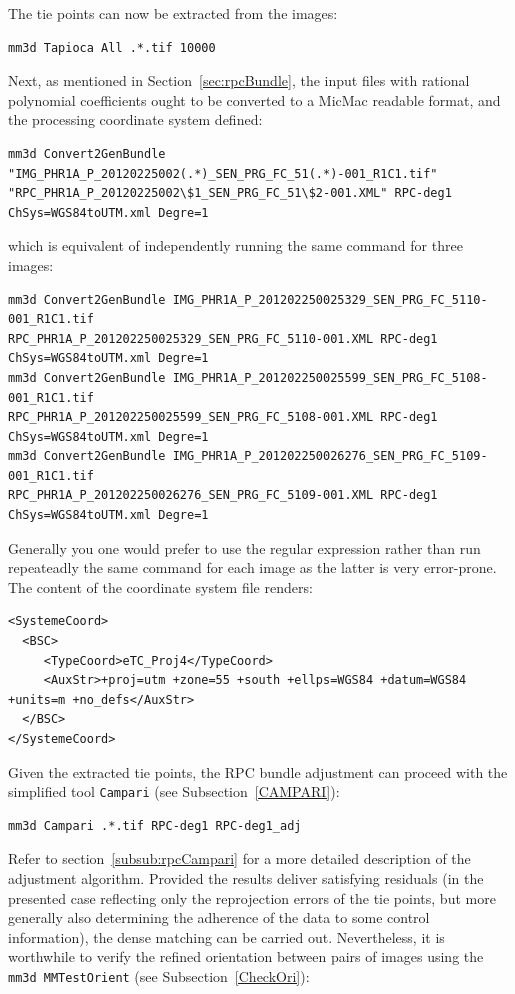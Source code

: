 %
The tie points can now be extracted from the images:
\begin{verbatim}
mm3d Tapioca All .*.tif 10000  
\end{verbatim}
%
Next, as mentioned in Section~\ref{sec:rpcBundle}, the input files with rational polynomial coefficients ought to be converted to a MicMac readable format, and the processing coordinate system defined:
\begin{verbatim}
mm3d Convert2GenBundle "IMG_PHR1A_P_20120225002(.*)_SEN_PRG_FC_51(.*)-001_R1C1.tif"
"RPC_PHR1A_P_20120225002\$1_SEN_PRG_FC_51\$2-001.XML" RPC-deg1 ChSys=WGS84toUTM.xml Degre=1
\end{verbatim}
%
which is equivalent of independently running the same command for three images:
%
\begin{verbatim} 
mm3d Convert2GenBundle IMG_PHR1A_P_201202250025329_SEN_PRG_FC_5110-001_R1C1.tif
RPC_PHR1A_P_201202250025329_SEN_PRG_FC_5110-001.XML RPC-deg1 ChSys=WGS84toUTM.xml Degre=1
mm3d Convert2GenBundle IMG_PHR1A_P_201202250025599_SEN_PRG_FC_5108-001_R1C1.tif
RPC_PHR1A_P_201202250025599_SEN_PRG_FC_5108-001.XML RPC-deg1 ChSys=WGS84toUTM.xml Degre=1
mm3d Convert2GenBundle IMG_PHR1A_P_201202250026276_SEN_PRG_FC_5109-001_R1C1.tif
RPC_PHR1A_P_201202250026276_SEN_PRG_FC_5109-001.XML RPC-deg1 ChSys=WGS84toUTM.xml Degre=1
\end{verbatim}
%
Generally you one would prefer to use the regular expression rather than run repeateadly the same command for each image as the latter is very error-prone. The content of the coordinate system file renders:
\begin{verbatim}
<SystemeCoord>
  <BSC>
     <TypeCoord>eTC_Proj4</TypeCoord>
     <AuxStr>+proj=utm +zone=55 +south +ellps=WGS84 +datum=WGS84 +units=m +no_defs</AuxStr>
  </BSC>
</SystemeCoord> 
\end{verbatim}
%
Given the extracted tie points, the RPC bundle adjustment can proceed with the simplified tool {\tt Campari} (see Subsection~\ref{CAMPARI}):
\begin{verbatim}
mm3d Campari .*.tif RPC-deg1 RPC-deg1_adj
\end{verbatim}
%   
Refer to section~\ref{subsub:rpcCampari} for a more detailed description of the adjustment algorithm. Provided the results deliver satisfying residuals (in the presented case reflecting only the reprojection errors of the tie points, but more generally also determining the adherence of the data to some control information), the dense matching can be carried out. Nevertheless, it is worthwhile to verify the refined orientation between pairs of images using the {\tt mm3d MMTestOrient} (see Subsection~\ref{CheckOri}):
